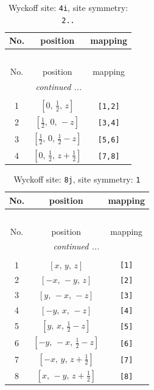 \documentclass[fleqn,8pt]{jsarticle}
\begin{document}
\renewcommand{\arraystretch}{1.2}
\begin{longtable}{ccc}
\caption{Wyckoff site: {\tt 4i}, site symmetry: {\tt 2..}}
 \\
 \hline \hline
No. & position & mapping \\ \hline \endfirsthead

\multicolumn{2}{l}{\tablename\ \thetable{}} \\
 \hline \hline
No. & position & mapping \\ \hline \endhead

 \hline \hline
\multicolumn{2}{r}{\footnotesize\it continued ...} \\ \endfoot

 \hline \hline
\multicolumn{2}{r}{} \\ \endlastfoot

1 & $\left[ 0,\, \frac{1}{2},\, z \right]$ & {\tt [1,2]} \\ \hline
2 & $\left[ \frac{1}{2},\, 0,\, - z \right]$ & {\tt [3,4]} \\ \hline
3 & $\left[ \frac{1}{2},\, 0,\, \frac{1}{2} - z \right]$ & {\tt [5,6]} \\ \hline
4 & $\left[ 0,\, \frac{1}{2},\, z + \frac{1}{2} \right]$ & {\tt [7,8]} \\
\end{longtable}
\renewcommand{\arraystretch}{1.2}
\begin{longtable}{ccc}
\caption{Wyckoff site: {\tt 8j}, site symmetry: {\tt 1}}
 \\
 \hline \hline
No. & position & mapping \\ \hline \endfirsthead

\multicolumn{2}{l}{\tablename\ \thetable{}} \\
 \hline \hline
No. & position & mapping \\ \hline \endhead

 \hline \hline
\multicolumn{2}{r}{\footnotesize\it continued ...} \\ \endfoot

 \hline \hline
\multicolumn{2}{r}{} \\ \endlastfoot

1 & $\left[ x,\, y,\, z \right]$ & {\tt [1]} \\ \hline
2 & $\left[ - x,\, - y,\, z \right]$ & {\tt [2]} \\ \hline
3 & $\left[ y,\, - x,\, - z \right]$ & {\tt [3]} \\ \hline
4 & $\left[ - y,\, x,\, - z \right]$ & {\tt [4]} \\ \hline
5 & $\left[ y,\, x,\, \frac{1}{2} - z \right]$ & {\tt [5]} \\ \hline
6 & $\left[ - y,\, - x,\, \frac{1}{2} - z \right]$ & {\tt [6]} \\ \hline
7 & $\left[ - x,\, y,\, z + \frac{1}{2} \right]$ & {\tt [7]} \\ \hline
8 & $\left[ x,\, - y,\, z + \frac{1}{2} \right]$ & {\tt [8]} \\
\end{longtable}
\end{document}
